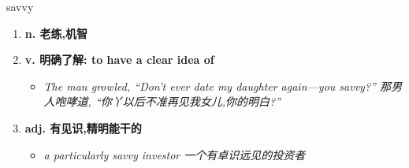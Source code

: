 
\begin{frame}
{\huge savvy}
\begin{center}
\begin{enumerate}\Large
  \item \textbf{n. 老练,机智}
  \item \textbf{v. 明确了解: to have a clear idea of}
  \begin{itemize}
    \item \em{\Large{The man growled, “Don't ever date my daughter again—you savvy?” 那男人咆哮道, “你丫以后不准再见我女儿,你的明白?”}}
  \end{itemize}
  \item \textbf{adj. 有见识,精明能干的}
  \begin{itemize}
    \item \em{\Large{a particularly savvy investor  一个有卓识远见的投资者}}
  \end{itemize}
\end{enumerate}
\end{center}
\end{frame}
